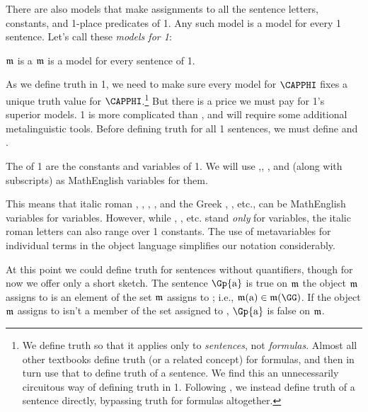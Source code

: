 There are also models that make assignments to all the sentence letters, constants, and 1-place predicates of \GQL{}1.  Any such model is a model for every \GQL{}1 sentence.  Let's call these \emph{models for \GQL{}1}:

\begin{majorILnc}{}
	$\mathfrak{m}$ is a  \Iff $\mathfrak{m}$ is a model for every sentence of \GQL{}1.
\end{majorILnc}

As we define truth in \GQL{}1, we need to make sure every model for $\CAPPHI$ fixes a unique truth value for $\CAPPHI$.\footnote{We define truth so that it applies only to \emph{sentences}, not \emph{formulas}.  Almost all other textbooks define truth (or a related concept) for formulas, and then in turn use that to define truth of a sentence.  We find this an unnecessarily circuitous way of defining truth in \GQL{}1.  Following \citealp{Mates1972}, we instead define truth of a sentence directly, bypassing truth for formulas altogether.} 
But there is a price we must pay for \GQL{}1's superior models.  \GQL{}1 is more complicated than \GSL{}, and will require some additional metalinguistic tools.  Before defining truth for all \GQL{}1 sentences, we must define  and .

\begin{majorILnc}{}
The  of \GQL{}1 are the constants and variables of \GQL{}1.  We will use ,, , and   (along with subscripts) as MathEnglish variables for them.
\end{majorILnc}
\noindent{}This means that italic roman , , , , and the Greek \mention{$\ALPHA$}, \mention{$\BETA$}, etc., can be MathEnglish variables for \GQL{} variables.
However, while \mention{$\ALPHA$}, \mention{$\BETA$}, etc. stand \emph{only} for variables, the italic roman letters can also range over \GQL{}1 constants.  The use of metavariables for individual terms in the object language simplifies our notation considerably.

At this point we could define truth for sentences without quantifiers, though for now we offer only a short sketch.  The sentence $\Gp{\constant{a}}$ is true on $\mathfrak{m}$ \Iff the object $\mathfrak{m}$ assigns to  is an element of the set $\mathfrak{m}$ assigns to \mention{$\GG$}; i.e., \Iff $\IntA(\constant{a})\in\IntA(\GG)$.  If the object $\mathfrak{m}$ assigns to  isn't a member of the set assigned to \mention{$\GG$}, $\Gp{\constant{a}}$ is false on $\mathfrak{m}$.

